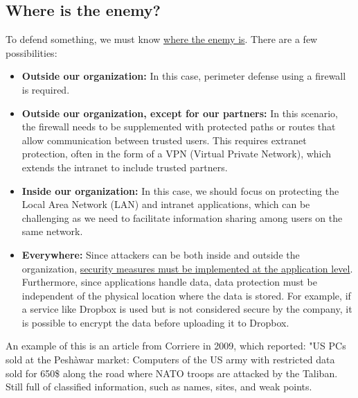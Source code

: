\subsection{Where is the enemy?}
To defend something, we must know \ul{where the enemy is}. There are a few possibilities:

\begin{itemize}
	\item \textbf{Outside our organization:} In this case, perimeter defense using a firewall is required.
	\item \textbf{Outside our organization, except for our partners:} In this scenario, the firewall needs to be supplemented with protected paths or routes that allow communication between trusted users. This requires extranet protection, often in the form of a VPN (Virtual Private Network), which extends the intranet to include trusted partners.
	\item \textbf{Inside our organization:} In this case, we should focus on protecting the Local Area Network (LAN) and intranet applications, which can be challenging as we need to facilitate information sharing among users on the same network.
	\item \textbf{Everywhere:} Since attackers can be both inside and outside the organization, \ul{security measures must be implemented at the application level}. Furthermore, since applications handle data, data protection must be independent of the physical location where the data is stored. For example, if a service like Dropbox is used but is not considered secure by the company, it is possible to encrypt the data before uploading it to Dropbox.
\end{itemize}


An example of this is an article from Corriere in 2009, which reported: "US PCs sold at the Peshàwar market: Computers
of the US army with restricted data sold for 650\$ along the road where NATO troops are attacked by the
Taliban. Still full of classified information, such as names, sites, and weak points.




